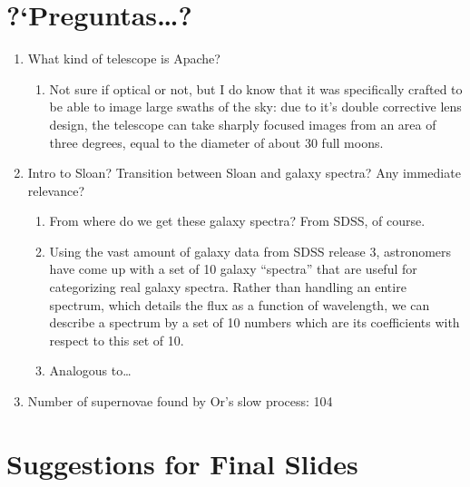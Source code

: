 \documentclass{article}
\begin{document}
\section{?`Preguntas\ldots?}
\label{sec:questions}

\begin{enumerate}
\item What kind of telescope is Apache?
  \begin{enumerate}
  \item Not sure if optical or not,
  but I do know that it was specifically crafted to be able to image
  large swaths of the sky: due to it's double corrective lens design,
  the telescope can take sharply focused images from an area of three
  degrees, equal to the diameter of about 30 full moons.
  \end{enumerate}
\item Intro to Sloan? Transition between Sloan and galaxy spectra?
  Any immediate relevance?
  \begin{enumerate}
  \item From where do we get these galaxy spectra?  From SDSS, of
    course.
  \item Using the vast amount of galaxy data from SDSS release 3,
    astronomers have come up with a set of 10 galaxy ``spectra'' that
    are useful for categorizing real galaxy spectra.  Rather than handling an entire spectrum, which details the
    flux as a function of wavelength, we can describe a spectrum by a
    set of 10 numbers which are its coefficients with respect to this
    set of 10.
  \item Analogous to\ldots
  \end{enumerate}
\item Number of supernovae found by Or's slow process: 104
\end{enumerate}

\section{Suggestions for Final Slides}
\label{sec:changes}
\end{document}
